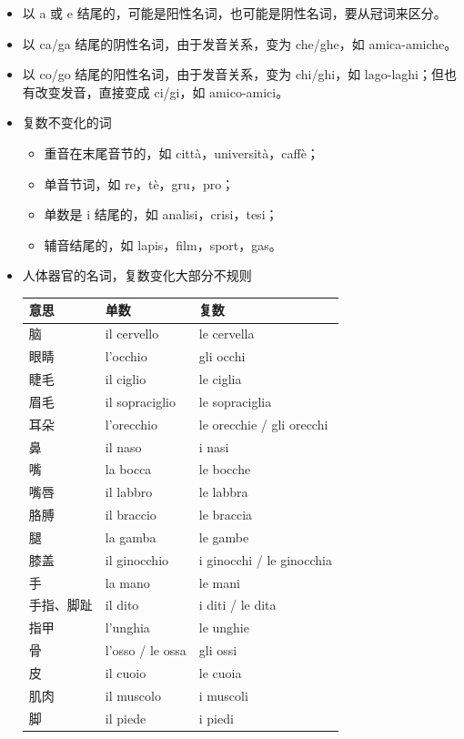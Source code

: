 \documentclass[UTF8,a4paper,titlepage,10pt]{report}
\begin{document}
\begin{enumerate}
\begin{itemize}
\item 以 a 或 e 结尾的，可能是阳性名词，也可能是阴性名词，要从冠词来区分。
\item 以 ca/ga 结尾的阴性名词，由于发音关系，变为 che/ghe，如 amica-amiche。
\item 以 co/go 结尾的阳性名词，由于发音关系，变为 chi/ghi，如 lago-laghi；但也有改变发音，直接变成 ci/gi，如 amico-amici。
\item 复数不变化的词
\begin{itemize}
\item 重音在末尾音节的，如 città，università，caffè；
\item 单音节词，如 re，tè，gru，pro；
\item 单数是 i 结尾的，如 analisi，crisi，tesi；
\item 辅音结尾的，如 lapis，film，sport，gas。
\end{itemize}
\item 人体器官的名词，复数变化大部分不规则
\begin{center}
\begin{tabular}{lll}
意思 & 单数 & 复数\\
\hline
脑 & il cervello & le cervella\\
眼睛 & l'occhio & gli occhi\\
睫毛 & il ciglio & le ciglia\\
眉毛 & il sopraciglio & le sopraciglia\\
耳朵 & l'orecchio & le orecchie / gli orecchi\\
鼻 & il naso & i nasi\\
嘴 & la bocca & le bocche\\
嘴唇 & il labbro & le labbra\\
胳膊 & il braccio & le braccia\\
腿 & la gamba & le gambe\\
膝盖 & il ginocchio & i ginocchi / le ginocchia\\
手 & la mano & le mani\\
手指、脚趾 & il dito & i diti / le dita\\
指甲 & l'unghia & le unghie\\
骨 & l'osso / le ossa & gli ossi\\
皮 & il cuoio & le cuoia\\
肌肉 & il muscolo & i muscoli\\
脚 & il piede & i piedi\\
\end{tabular}
\end{center}
\end{itemize}
\end{enumerate}
\end{document}
